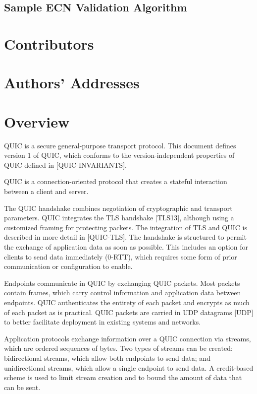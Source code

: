 \documentclass{article}
\begin{document}
\subsection{Sample ECN Validation Algorithm}

\section*{Contributors}

\section*{Authors' Addresses}

\section{Overview}

QUIC is a secure general-purpose transport protocol.  This document defines version 1 of QUIC, which conforms to the version-independent properties of QUIC defined in [QUIC-INVARIANTS].

QUIC is a connection-oriented protocol that creates a stateful interaction between a client and server.

The QUIC handshake combines negotiation of cryptographic and transport parameters.  QUIC integrates the TLS handshake [TLS13], although using a customized framing for protecting packets.  The integration of TLS and QUIC is described in more detail in [QUIC-TLS].  The handshake is structured to permit the exchange of application data as soon as possible.  This includes an option for clients to send data immediately (0-RTT), which requires some form of prior communication or configuration to enable.

Endpoints communicate in QUIC by exchanging QUIC packets.  Most packets contain frames, which carry control information and application data between endpoints.  QUIC authenticates the entirety of each packet and encrypts as much of each packet as is practical. QUIC packets are carried in UDP datagrams [UDP] to better facilitate deployment in existing systems and networks.

Application protocols exchange information over a QUIC connection via streams, which are ordered sequences of bytes.  Two types of streams can be created: bidirectional streams, which allow both endpoints to send data; and unidirectional streams, which allow a single endpoint to send data.  A credit-based scheme is used to limit stream creation and to bound the amount of data that can be sent.
\end{document}
